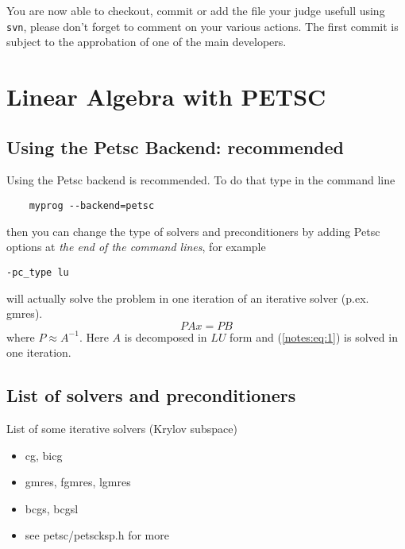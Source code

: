 You are now able to checkout, commit or add the file your judge usefull using \verb|svn|, please don't forget to comment on your various actions. The first commit is subject to the approbation of one of the main developers.


\section{Linear Algebra with PETSC}

\subsection{Using the Petsc Backend: recommended}

Using the Petsc backend is recommended. To do that type in the command line
\begin{lstlisting}
    myprog --backend=petsc
  \end{lstlisting}
  then you can change the type of solvers and preconditioners by
  adding Petsc options at \emph{the end of the command lines}, for example
\begin{verbatim}
-pc_type lu
\end{verbatim}
  will actually solve the problem in one iteration of an iterative solver
  (p.ex. gmres).
  \begin{equation}
    \label{notes:eq:1}
    P A x = P B
  \end{equation}
  where $P \approx A^{-1}$. Here $A$ is decomposed in $LU$ form and
  (\ref{notes:eq:1}) is solved in one iteration.

\subsection{List of solvers and preconditioners}
\label{sec:list-solv-prec}

List of some iterative solvers (Krylov subspace)
\begin{itemize}
\item cg, bicg
\item gmres, fgmres, lgmres
\item bcgs, bcgsl
\item see petsc/petscksp.h for more
\end{itemize}

